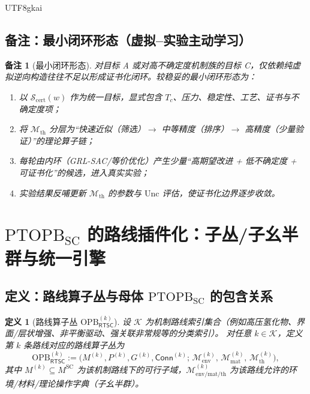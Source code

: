 \documentclass[12pt]{article}
\newtheorem{definition}{定义}[section]
\newtheorem{remark}{备注}[section]
\newcommand{\PTOPB}{\ensuremath{\mathrm{PTOPB}}}
\newcommand{\OPB}{\ensuremath{\mathrm{OPB}}}
\newcommand{\RTSC}{\textsf{RTSC}}
\newcommand{\Conn}{\ensuremath{\mathsf{Conn}}}
\begin{document}
\begin{CJK*}{UTF8}{gkai}
\subsection{备注：最小闭环形态（虚拟--实验主动学习）}

\begin{remark}[最小闭环形态]
对目标 A 或对高不确定度机制族的目标 C，仅依赖纯虚拟逆向构造往往不足以形成证书化闭环。较稳妥的最小闭环形态为：
\begin{enumerate}
  \item 以 $\mathcal{S}_{\mathrm{cert}}(w)$ 作为统一目标，显式包含 $T_c$、压力、稳定性、工艺、证书与不确定度项；
  \item 将 $\mathcal{M}_{\mathrm{th}}$ 分层为“快速近似（筛选）$\to$ 中等精度（排序）$\to$ 高精度（少量验证）”的理论算子链；
  \item 每轮由内环（GRL-SAC/等价优化）产生少量“高期望改进 + 低不确定度 + 可证书化”的候选，进入真实实验；
  \item 实验结果反哺更新 $\mathcal{M}_{\mathrm{th}}$ 的参数与 $\mathrm{Unc}$ 评估，使证书化边界逐步收敛。
\end{enumerate}
\end{remark}

\clearpage
\section{\PTOPB$_{\mathrm{SC}}$ 的路线插件化：子丛/子幺半群与统一引擎}
\label{sec:ptopb-plugin}

\subsection{定义：路线算子丛与母体 \PTOPB$_{\mathrm{SC}}$ 的包含关系}

\begin{definition}[路线算子丛 $\OPB^{(k)}_{\RTSC}$]
\label{def:opb-k}
设 $\mathcal{K}$ 为机制路线索引集合（例如高压氢化物、界面/层状增强、非平衡驱动、强关联非常规等的分类索引）。
对任意 $k\in\mathcal{K}$，定义第 $k$ 条路线对应的路线算子丛为
\[
  \OPB^{(k)}_{\RTSC}
  :=
  \bigl(
    M^{(k)},
    P^{(k)},
    G^{(k)},
    \Conn^{(k)};\,
    \mathcal{M}^{(k)}_{\mathrm{env}},\,
    \mathcal{M}^{(k)}_{\mathrm{mat}},\,
    \mathcal{M}^{(k)}_{\mathrm{th}}
  \bigr),
\]
其中 $M^{(k)}\subseteq M^{\mathrm{SC}}$ 为该机制路线下的可行子域，$\mathcal{M}^{(k)}_{\mathrm{env/mat/th}}$ 为该路线允许的环境/材料/理论操作字典（子幺半群）。
\end{definition}


\end{CJK*}
\end{document}
